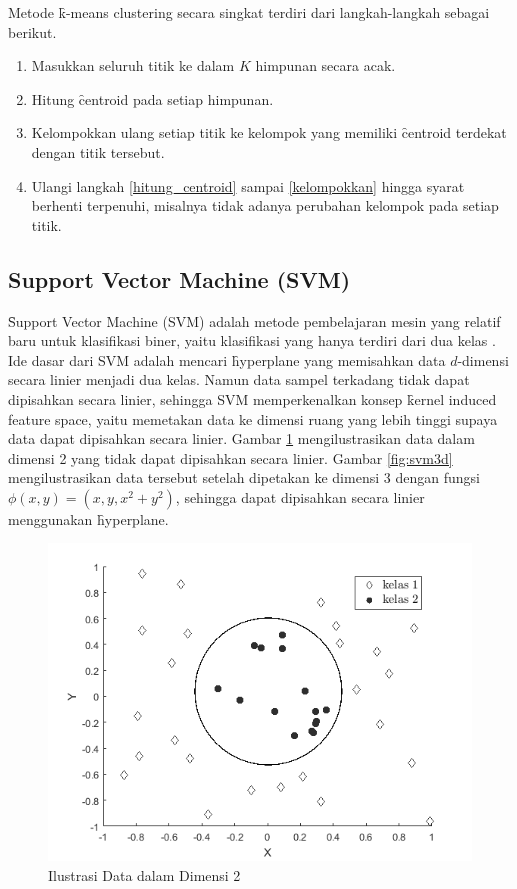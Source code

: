   Metode \f{k-means clustering} secara singkat terdiri dari langkah-langkah sebagai berikut.
  \begin{enumerate}
    \item Masukkan seluruh titik ke dalam $K$ himpunan secara acak.
    \item \label{hitung_centroid} Hitung \f{centroid} pada setiap himpunan.
    \item \label{kelompokkan} Kelompokkan ulang setiap titik ke kelompok yang memiliki \f{centroid} terdekat dengan titik tersebut.
    \item Ulangi langkah \ref{hitung_centroid} sampai \ref{kelompokkan} hingga syarat berhenti terpenuhi, misalnya tidak adanya perubahan kelompok pada setiap titik.
  \end{enumerate}



  \subsection{Support Vector Machine (SVM)}
  \f{Support Vector Machine} (SVM) adalah metode pembelajaran mesin yang relatif baru untuk klasifikasi biner, yaitu klasifikasi yang hanya terdiri dari dua kelas \citep{svm}. Ide dasar dari SVM adalah mencari \f{hyperplane} yang memisahkan data $d$-dimensi secara linier menjadi dua kelas. Namun data sampel terkadang tidak dapat dipisahkan secara linier, sehingga SVM memperkenalkan konsep \f{kernel induced feature space}, yaitu memetakan data ke dimensi ruang yang lebih tinggi supaya data dapat dipisahkan secara linier. Gambar \ref{fig:svm2d} mengilustrasikan data dalam dimensi 2 yang tidak dapat dipisahkan secara linier. Gambar \ref{fig:svm3d} mengilustrasikan data tersebut setelah dipetakan ke dimensi 3 dengan fungsi $\phi(x,y)=(x,y,x^2+y^2)$, sehingga dapat dipisahkan secara linier menggunakan \f{hyperplane}.

  \begin{figure}
    \centering
    \includegraphics[width=\linewidth]{pics/svm_2db_mono}
    \caption{Ilustrasi Data dalam Dimensi 2}
    \label{fig:svm2d}
  \end{figure}


